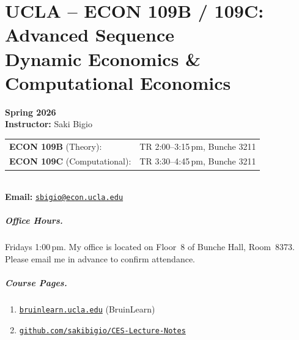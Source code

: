 
\chapter*{UCLA -- ECON 109B / 109C: Advanced Sequence\\
Dynamic Economics \& Computational Economics}

\noindent
\textbf{Spring 2026}\\[0.3em]
\textbf{Instructor:} Saki Bigio\\[0.3em]
\begin{tabular}{@{}ll@{}}
\textbf{ECON 109B} (Theory):        & TR 2:00--3:15\,pm, Bunche 3211 \\
\textbf{ECON 109C} (Computational): & TR 3:30--4:45\,pm, Bunche 3211 \\
\end{tabular}\\[0.3em]
\textbf{Email:} \href{mailto:sbigio@econ.ucla.edu}{\texttt{sbigio@econ.ucla.edu}}

\paragraph{Office Hours.}
Fridays 1:00\,pm.
My office is located on Floor~8 of Bunche Hall, Room~8373.
Please email me in advance to confirm attendance.

\paragraph{Course Pages.}
\begin{enumerate}
    \item \href{https://bruinlearn.ucla.edu}{\texttt{bruinlearn.ucla.edu}} (BruinLearn)
    \item \href{https://github.com/sakibigio/CES-Lecture-Notes}{\texttt{github.com/sakibigio/CES-Lecture-Notes}}
\end{enumerate}


